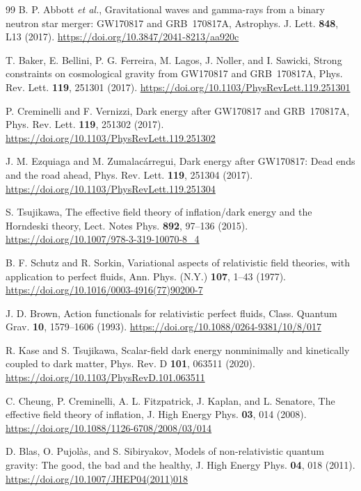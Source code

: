 \documentclass[aps,prd,reprint,onecolumn,notitlepage,nofootinbib,longbibliography,floatfix]{revtex4-2}
\theoremstyle{scstyle}
\theoremstyle{definition}
\theoremstyle{remark}
\begin{document}
\begin{thebibliography}{99}
B. P. Abbott \textit{et al.}, Gravitational waves and gamma-rays from a binary neutron star merger: GW170817 and GRB~170817A, Astrophys. J. Lett. \textbf{848}, L13 (2017). \url{https://doi.org/10.3847/2041-8213/aa920c}

T. Baker, E. Bellini, P. G. Ferreira, M. Lagos, J. Noller, and I. Sawicki, Strong constraints on cosmological gravity from GW170817 and GRB~170817A, Phys. Rev. Lett. \textbf{119}, 251301 (2017). \url{https://doi.org/10.1103/PhysRevLett.119.251301}

P. Creminelli and F. Vernizzi, Dark energy after GW170817 and GRB~170817A, Phys. Rev. Lett. \textbf{119}, 251302 (2017). \url{https://doi.org/10.1103/PhysRevLett.119.251302}

J. M. Ezquiaga and M. Zumalac\'arregui, Dark energy after GW170817: Dead ends and the road ahead, Phys. Rev. Lett. \textbf{119}, 251304 (2017). \url{https://doi.org/10.1103/PhysRevLett.119.251304}

S. Tsujikawa, The effective field theory of inflation/dark energy and the Horndeski theory, Lect. Notes Phys. \textbf{892}, 97--136 (2015). \url{https://doi.org/10.1007/978-3-319-10070-8_4}

B. F. Schutz and R. Sorkin, Variational aspects of relativistic field theories, with application to perfect fluids, Ann. Phys. (N.Y.) \textbf{107}, 1--43 (1977). \url{https://doi.org/10.1016/0003-4916(77)90200-7}

J. D. Brown, Action functionals for relativistic perfect fluids, Class. Quantum Grav. \textbf{10}, 1579--1606 (1993). \url{https://doi.org/10.1088/0264-9381/10/8/017}

R. Kase and S. Tsujikawa, Scalar-field dark energy nonminimally and kinetically coupled to dark matter, Phys. Rev. D \textbf{101}, 063511 (2020). \url{https://doi.org/10.1103/PhysRevD.101.063511}

C. Cheung, P. Creminelli, A. L. Fitzpatrick, J. Kaplan, and L. Senatore,
The effective field theory of inflation, J. High Energy Phys. \textbf{03}, 014 (2008).
\url{https://doi.org/10.1088/1126-6708/2008/03/014}

D. Blas, O. Pujol\`as, and S. Sibiryakov,
Models of non-relativistic quantum gravity: The good, the bad and the healthy,
J. High Energy Phys. \textbf{04}, 018 (2011).
\url{https://doi.org/10.1007/JHEP04(2011)018}


\end{thebibliography}
\end{document}
